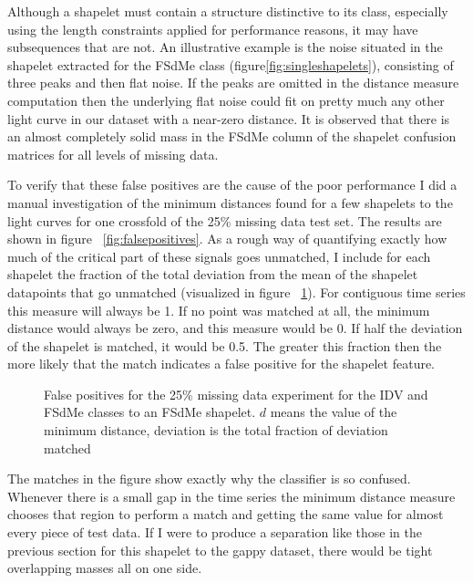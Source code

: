 Although a shapelet must contain a structure distinctive to its class, especially using the length constraints applied for performance reasons, it may have subsequences that are not. An illustrative example is the noise situated in the shapelet extracted for the FSdMe class (figure\ref{fig:singleshapelets}), consisting of three peaks and then flat noise. If the peaks are omitted in the distance measure computation then the underlying flat noise could fit on pretty much any other light curve in our dataset with a near-zero distance. It is observed that there is an almost completely solid mass in the FSdMe column of the shapelet confusion matrices for all levels of missing data.

To verify that these false positives are the cause of the poor performance I did a manual investigation of the minimum distances found for a few shapelets to the light curves for one crossfold of the 25\% missing data test set. The results are shown in figure ~\ref{fig:falsepositives}. As a rough way of quantifying exactly how much of the critical part of these signals goes unmatched, I include for each shapelet the fraction of the total deviation from the mean of the shapelet datapoints that go unmatched (visualized in figure ~\ref{fig:unmatchedshapelets}). For contiguous time series this measure will always be 1. If no point was matched at all, the minimum distance would always be zero, and this measure would be 0. If half the deviation of the shapelet is matched, it would be 0.5. The greater this fraction then the more likely that the match indicates a false positive for the shapelet feature.

\begin{figure}[ht!]
	\label{fig:unmatchedshapelets}
	\caption{False positives for the 25\% missing data experiment for the IDV and FSdMe classes to an FSdMe shapelet. $d$ means the value of the minimum distance, deviation is the total fraction of deviation matched}
\end{figure}

The matches in the figure show exactly why the classifier is so confused. Whenever there is a small gap in the time series the minimum distance measure chooses that region to perform a match and getting the same value for almost every piece of test data. If I were to produce a separation like those in the previous section for this shapelet to the gappy dataset, there would be tight overlapping masses all on one side.

